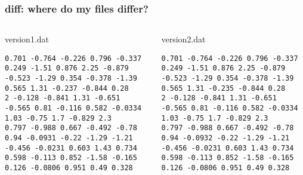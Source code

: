 \documentclass{beamer}
\begin{document}
\begin{frame}[fragile]
\frametitle{diff: where do my files differ?}
\label{sec-1-3}
\begin{columns}
\begin{column}{0.5\textwidth}
\begin{block}{version1.dat}
\label{sec-1-3-1}

\footnotesize

\begin{verbatim}
0.701 -0.764 -0.226 0.796 -0.337
0.249 -1.51 0.876 2.25 -0.879
-0.523 -1.29 0.354 -0.378 -1.39
0.565 1.31 -0.237 -0.844 0.28
2 -0.128 -0.841 1.31 -0.651
-0.565 0.81 -0.116 0.582 -0.0334
1.03 -0.75 1.7 -0.829 2.3
0.797 -0.988 0.667 -0.492 -0.78
0.94 -0.0931 -0.22 -1.29 -1.21
-0.456 -0.0231 0.603 1.43 0.734
0.598 -0.113 0.852 -1.58 -0.165
0.126 -0.0806 0.951 0.49 0.328
\end{verbatim}
\end{block}
\end{column}
\begin{column}{0.5\textwidth}
\begin{block}{version2.dat}
\label{sec-1-3-2}

\footnotesize

\begin{verbatim}
0.701 -0.764 -0.226 0.796 -0.337
0.249 -1.51 0.876 2.25 -0.879
-0.523 -1.29 0.354 -0.378 -1.39
0.565 1.31 -0.235 -0.844 0.28
2 -0.128 -0.841 1.31 -0.651
-0.565 0.81 -0.116 0.582 -0.0334
1.03 -0.75 1.7 -0.829 2.3
0.797 -0.988 0.667 -0.492 -0.78
0.94 -0.0932 -0.22 -1.29 -1.21
-0.456 -0.0231 0.603 1.43 0.734
0.598 -0.113 0.852 -1.58 -0.165
0.126 -0.0806 0.951 0.49 0.328
\end{verbatim}

\end{block}
\end{column}
\end{columns}
\end{frame}
\end{document}
